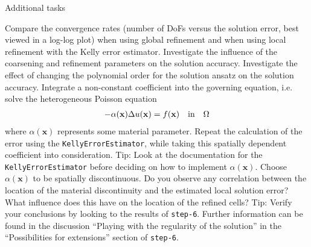 \documentclass[11pt]{exam}
\begin{document}
\begin{questions}

\question Additional tasks
\begin{parts}
\bonuspart Compare the convergence rates (number of DoFs versus the solution error, best viewed in a log-log plot) when using global refinement and when using local refinement with the Kelly error estimator.
\bonuspart Investigate the influence of the coarsening and refinement parameters on the solution accuracy.
\bonuspart Investigate the effect of changing the polynomial order for the solution ansatz on the solution accuracy.
\bonuspart Integrate a non-constant coefficient into the governing equation, i.e. solve the heterogeneous Poisson equation
\begin{gather*}
-\alpha(\mathbf{x}) \Delta u(\mathbf{x}) = f(\mathbf{x}) \quad \textnormal{in} \quad \Omega
\end{gather*}
where $\alpha(\mathbf{x})$ represents some material parameter.
Repeat the calculation of the error using the \verb|KellyErrorEstimator|, while taking this spatially dependent coefficient into consideration. 
Tip: Look at the documentation for the \verb|KellyErrorEstimator| before deciding on how to implement $\alpha(\mathbf{x})$.
\bonuspart Choose $\alpha(\mathbf{x})$ to be spatially discontinuous.
Do you observe any correlation between the location of the material discontinuity and the estimated local solution error?
What influence does this have on the location of the refined cells?
Tip: Verify your conclusions by looking to the results of \verb|step-6|.
Further information can be found in the discussion ``Playing with the regularity of the solution'' in the ``Possibilities for extensions'' section of \verb|step-6|.
\end{parts}


\end{questions}
\end{document}
